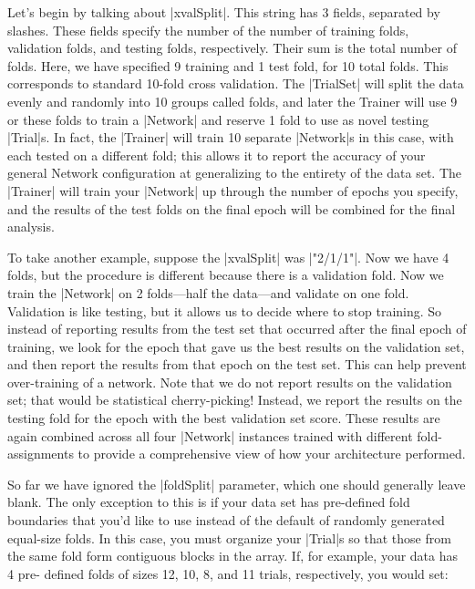 \documentclass{article}
\begin{document}
Let's begin by talking about |xvalSplit|. This string has 3 fields, separated by slashes. These fields
specify the number of the number of training folds, validation folds, and testing folds, 
respectively. Their sum is the total number of folds. Here, we have specified 9 training and 1 test
fold, for 10 total folds. This corresponds to standard 10-fold cross validation. The  |TrialSet| will
split the data evenly and randomly into 10 groups called folds, and later the Trainer
will use 9 or these folds to train a |Network| and reserve 1 fold to use as novel testing  |Trial|s. In
fact, the |Trainer| will train 10 separate |Network|s in this case, with each tested on a
different fold; this allows it to report the accuracy of your general Network configuration at
generalizing to the entirety of the data set. The |Trainer| will train your |Network| up
through the number of epochs you specify, and the results of the test folds on the final epoch will
be combined for the final analysis.

To take another example, suppose the |xvalSplit| was |"2/1/1"|. Now we have 4 folds, but the procedure
is different because there is a validation fold. Now we train the |Network| on 2 folds---half the
data---and validate on one fold. Validation is like testing, but it allows us to decide where to
stop training. So instead of reporting results from the test set that occurred after the final epoch of training, we look for the
epoch that gave us the best results on the validation set, and then report the results from that epoch on the test set. This can help prevent over-training of a network.
Note that we do not report results on the validation set; that would be statistical cherry-picking!
Instead, we report the results on the testing fold for the epoch with the best validation set score.
These results are again combined across all four |Network| instances trained with different fold-assignments to
provide a comprehensive view of how your architecture performed.

So far we have ignored the |foldSplit| parameter, which one should generally leave blank. The only
exception to this is if your data set has pre-defined fold boundaries that you'd like to use instead
of the default of randomly generated equal-size folds. In this case, you must organize your  |Trial|s so that
those from the same fold form contiguous blocks in the array. If, for example, your data has 4 pre-
defined folds of sizes 12, 10, 8, and 11 trials, respectively, you would set:
\end{document}
